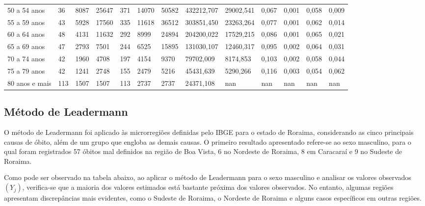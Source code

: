 \documentclass[
  12pt,
  a4paper,
]{scrreprt}
\begin{document}
\begin{longtable}[]{@{}lllllllllllll@{}}
50 a 54 anos & 36 & 8087 & 25647 & 371 & 14070 & 50582 & 432212,707 &
29002,541 & 0,067 & 0,001 & 0,058 & 0,009 \\
55 a 59 anos & 43 & 5928 & 17560 & 335 & 11618 & 36512 & 303851,450 &
23263,264 & 0,077 & 0,001 & 0,062 & 0,014 \\
60 a 64 anos & 48 & 4131 & 11632 & 292 & 8999 & 24894 & 204200,022 &
17529,215 & 0,086 & 0,001 & 0,065 & 0,021 \\
65 a 69 anos & 47 & 2793 & 7501 & 244 & 6525 & 15895 & 131030,107 &
12460,317 & 0,095 & 0,002 & 0,064 & 0,031 \\
70 a 74 anos & 42 & 1960 & 4708 & 197 & 4154 & 9370 & 79702,009 &
8174,853 & 0,103 & 0,002 & 0,058 & 0,044 \\
75 a 79 anos & 42 & 1241 & 2748 & 155 & 2479 & 5216 & 45431,639 &
5290,266 & 0,116 & 0,003 & 0,054 & 0,062 \\
80 anos e mais & 113 & 1507 & 1507 & 113 & 2737 & 2737 & 24371,108 & nan
& nan & nan & nan & nan \\
\end{longtable}

\subsection{Método de Leadermann}\label{muxe9todo-de-leadermann}

O método de Leadermann foi aplicado às microrregiões definidas pelo IBGE
para o estado de Roraima, considerando as cinco principais causas de
óbito, além de um grupo que engloba as demais causas. O primeiro
resultado apresentado refere-se ao sexo masculino, para o qual foram
registrados 57 óbitos mal definidos na região de Boa Vista, 6 no
Nordeste de Roraima, 8 em Caracaraí e 9 no Sudeste de Roraima.

\vspace{12pt}

Como pode ser observado na tabela abaixo, ao aplicar o método de
Leadermann para o sexo masculino e analisar os valores observados
\(\left(Y_{j}\right)\), verifica-se que a maioria dos valores estimados
está bastante próxima dos valores observados. No entanto, algumas
regiões apresentam discrepâncias mais evidentes, como o Sudeste de
Roraima, o Nordeste de Roraima e alguns casos específicos em outras
regiões.
\end{document}
